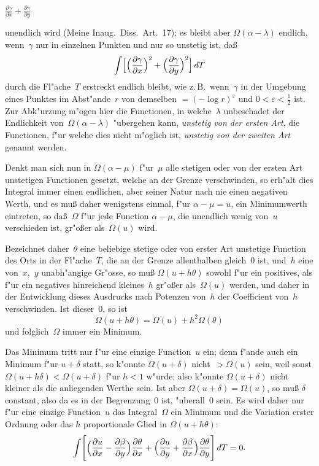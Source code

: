 \documentclass[12pt,a4paper]{article}
\begin{document}
$\displaystyle \frac{\partial\gamma}{\partial x} + \frac{\partial\gamma}{\partial y}$

unendlich wird (Meine Inaug.\ Diss.\ Art.~17); es bleibt aber
$\Omega(\alpha - \lambda)$ endlich, wenn~$\gamma$ nur in einzelnen Punkten und
nur so unstetig ist, da\ss{}
\[
\int\Bigl[\Bigl(\frac{\partial\gamma}{\partial x}\Bigr)^2
+ \Bigl(\frac{\partial\gamma}{\partial y}\Bigr)^2\Bigr]\,dT
\]
durch die Fl"ache~$T$ erstreckt endlich bleibt, wie z.\,B.\ wenn~$\gamma$ in
der Umgebung eines Punktes im Abst"ande~$r$ von demselben
$= (-\log r)^\varepsilon$ und $0 < \varepsilon < \frac{1}{2}$ ist. Zur Abk"urzung m"ogen
hier die Functionen, in welche~$\lambda$ unbeschadet der Endlichkeit
von~$\Omega(\alpha - \lambda)$ "ubergehen kann, \emph{unstetig von der ersten Art},
die Functionen, f"ur welche dies nicht m"oglich ist, \emph{unstetig von der
zweiten Art} genannt werden.

Denkt man sich nun in $\Omega(\alpha - \mu)$ f"ur~$\mu$ alle stetigen oder von der
ersten Art unstetigen Functionen gesetzt, welche an der Grenze verschwinden,
so erh"alt dies Integral immer einen endlichen, aber seiner Natur nach nie
einen negativen Werth, und es mu\ss{} daher wenigstens einmal,
f"ur $\alpha - \mu = u$, ein Minimumwerth eintreten, so da\ss{}~$\Omega$ f"ur jede
Function $\alpha - \mu$, die unendlich wenig von~$u$ verschieden ist, gr"o\ss{}er
als~$\Omega(u)$ wird.

Bezeichnet daher~$\theta$ eine beliebige stetige oder von erster Art unstetige
Function des Orts in der Fl"ache~$T$, die an der Grenze allenthalben
gleich~$0$ ist, und~$h$ eine von~$x$,~$y$ unabh"angige Gr"osse, so mu\ss{}
$\Omega(u + h\theta)$ sowohl f"ur ein positives, als f"ur ein negatives
hinreichend kleines~$h$ gr"o\ss{}er als~$\Omega(u)$ werden, und daher in der
Entwicklung dieses Ausdrucks nach Potenzen von~$h$ der Coefficient von~$h$
verschwinden. Ist dieser~$0$, so ist
\[
\Omega(u + h\theta) = \Omega(u) + h^2 \Omega(\theta)
\]
und folglich~$\Omega$ immer ein Minimum.

Das Minimum tritt nur f"ur eine einzige Function~$u$ ein; denn f"ande
auch ein Minimum f"ur $u + \delta$ statt, so k"onnte $\Omega(u + \delta)$
nicht~$> \Omega(u)$ sein, weil sonst $\Omega(u + h\delta) < \Omega(u + \delta)$
f"ur $h < 1$ w"urde; also k"onnte $\Omega(u + \delta)$ nicht kleiner als die
anliegenden Werthe sein. Ist aber $\Omega(u + \delta) = \Omega(u)$, so mu\ss{}
$\delta$ constant, also da es in der Begrenzung~$0$ ist, "uberall~$0$ sein.
Es wird daher nur f"ur eine einzige Function~$u$ das Integral~$\Omega$ ein
Minimum und die Variation erster Ordnung oder das $h$ proportionale Glied
in $\Omega(u + h\theta)$:
\begin{equation}
\label{eq:var1}
\int\Biggl[\Bigl(\frac{\partial u}{\partial x} - \frac{\partial\beta}{\partial y}\Bigr)
\frac{\partial\theta}{\partial x}
+ \Bigl(\frac{\partial u}{\partial y} + \frac{\partial\beta}{\partial x}\Bigr)
\frac{\partial\theta}{\partial y}\Biggr]\,dT = 0.
\end{equation}
\end{document}
